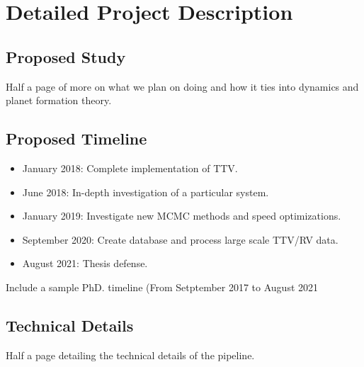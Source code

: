 \section{Detailed Project Description}
\subsection{Proposed Study}
Half a page of more on what we plan on doing and how it ties into dynamics and planet formation theory.
\subsection{Proposed Timeline}
\begin{itemize}
	\item January 2018: Complete implementation of TTV.
	\item June 2018: In-depth investigation of a particular system.
	\item January 2019: Investigate new MCMC methods and speed optimizations.
	\item September 2020: Create database and process large scale TTV/RV data.
	\item August 2021: Thesis defense.
\end{itemize}
Include a sample PhD. timeline (From Setptember 2017 to August 2021 
\subsection{Technical Details}
Half a page detailing the technical details of the pipeline.

